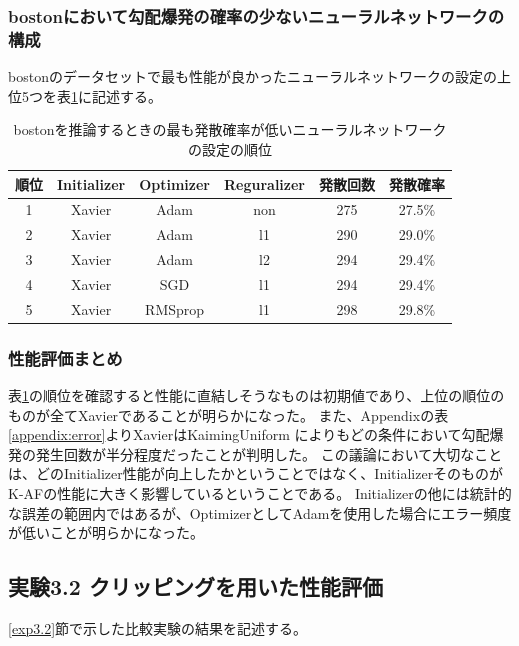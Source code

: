 \subsubsection{bostonにおいて勾配爆発の確率の少ないニューラルネットワークの構成}
bostonのデータセットで最も性能が良かったニューラルネットワークの設定の上位5つを表\ref{bostonbest}に記述する。


\begin{table}[htbp]
    \begin{center}
        \caption{bostonを推論するときの最も発散確率が低いニューラルネットワークの設定の順位}
        \label{bostonbest}
        \vspace{2mm} 
        \begin{tabular}{ |c||c|c|c|c|c| }
        \hline
        順位 & Initializer & Optimizer &  Reguralizer & 発散回数 & 発散確率 \\
        \hline
        1 & Xavier & Adam & non & 275 & 27.5\%　\\
        \hline
        2 & Xavier & Adam & l1 & 290 & 29.0\%　\\
        \hline
        3 & Xavier & Adam & l2 & 294 & 29.4\%　\\
        \hline
        4 & Xavier & SGD & l1 & 294 & 29.4\%　\\
        \hline
        5 & Xavier & RMSprop & l1 & 298 & 29.8\%　\\
        \hline
        \end{tabular}
    \end{center}
\end{table}


\subsubsection{性能評価まとめ}
表\ref{bostonbest}の順位を確認すると性能に直結しそうなものは初期値であり、上位の順位のものが全てXavierであることが明らかになった。
また、Appendixの表\ref{appendix:error}よりXavierはKaimingUniform によりもどの条件において勾配爆発の発生回数が半分程度だったことが判明した。
この議論において大切なことは、どのInitializer性能が向上したかということではなく、InitializerそのものがK-AFの性能に大きく影響しているということである。
Initializerの他には統計的な誤差の範囲内ではあるが、OptimizerとしてAdamを使用した場合にエラー頻度が低いことが明らかになった。

\subsection{実験3.2 クリッピングを用いた性能評価}
\label{evo3.2}
\ref{exp3.2}節で示した比較実験の結果を記述する。


